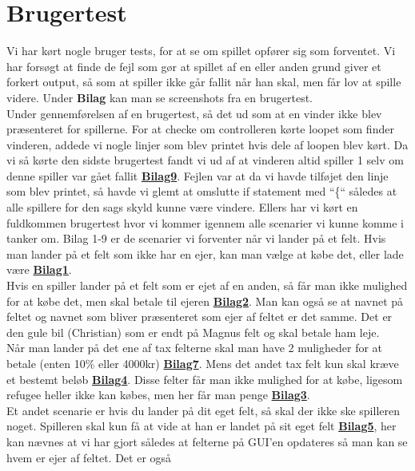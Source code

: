 \section*{Brugertest}
Vi har kørt nogle bruger tests, for at se om spillet opfører sig som forventet.
Vi har forsøgt at finde de fejl som gør at spillet af en eller anden grund giver
et forkert output, så som at spiller ikke går fallit når han skal, men får lov
at spille videre. Under \textbf{Bilag} kan man se screenshots fra en
brugertest.\\
\indent Under gennemførelsen af en brugertest, så det ud som at en vinder ikke
blev præsenteret for spillerne. For at checke om controlleren kørte loopet som
finder vinderen, addede vi nogle linjer som blev printet hvis dele af loopen
blev kørt. Da vi så kørte den sidste brugertest fandt vi ud af at vinderen altid
spiller 1 selv om denne spiller var gået fallit \textbf{\hyperref[bilag9]{Bilag9}}.
Fejlen var at da vi havde tilføjet den linje som blev printet, så havde vi glemt at omslutte if
statement med “\{“ således at alle spillere for den sags skyld kunne være
vindere. Ellers har vi kørt en fuldkommen brugertest hvor vi kommer igennem alle
scenarier vi kunne komme i tanker om. Bilag 1-9 er de scenarier vi forventer når
vi lander på et felt. Hvis man lander på et felt som ikke har en ejer, kan man
vælge at købe det, eller lade være \textbf{\hyperref[bilag1]{Bilag1}}.\\
\indent Hvis en spiller lander på et felt som er ejet af en anden, så får man
ikke mulighed for at købe det, men skal betale til ejeren
\textbf{\hyperref[bilag2]{Bilag2}}. Man kan også se at navnet på feltet og
navnet som bliver præsenteret som ejer af feltet er det samme. Det er den gule bil
(Christian) som er endt på Magnus felt og skal betale ham leje.\\
\indent Når man lander på det ene af tax felterne skal man have 2 muligheder for
at betale (enten 10\% eller 4000kr) \textbf{\hyperref[bilag7]{Bilag7}}. Mens det
andet tax felt kun skal kræve et bestemt beløb
\textbf{\hyperref[bilag4]{Bilag4}}. Disse felter får man ikke mulighed for at
købe, ligesom refugee heller ikke kan købes, men her får man penge
\textbf{\hyperref[bilag3]{Bilag3}}.\\
\indent Et andet scenarie er hvis du lander på dit eget felt, så skal der ikke
ske spilleren noget. Spilleren skal kun få at vide at han er landet på sit eget
felt \textbf{\hyperref[bilag5]{Bilag5}}, her kan nævnes at vi har gjort således
at felterne på GUI’en opdateres så man kan se hvem er ejer af feltet. Det er også
